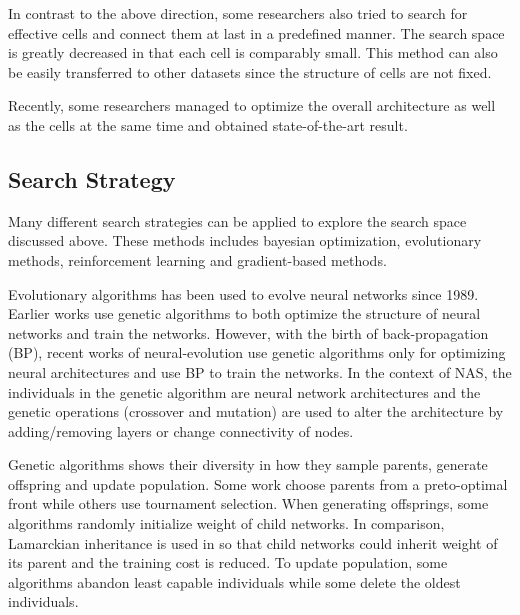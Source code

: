 \documentclass{article}
\begin{document}
\begin{normalsize}
    In contrast to the above direction, some researchers also tried to search for effective cells and connect them at last in a predefined manner\cite{zoph2018learning}\cite{cai2018path}. The search space is greatly decreased in that each cell is comparably small. This method can also be easily transferred to other datasets\cite{zoph2018learning} since the structure of cells are not fixed.

    Recently, some researchers managed to optimize the overall architecture as well as the cells at the same time and obtained state-of-the-art result\cite{liu2019auto}.
    
    \subsection{Search Strategy}
    
    Many different search strategies can be applied to explore the search space discussed above. These methods includes bayesian optimization, evolutionary methods, reinforcement learning and gradient-based methods. 

    Evolutionary algorithms has been used to evolve neural networks since 1989\cite{miller1989designing}. Earlier works use genetic algorithms to both optimize the structure of neural networks and train the networks\cite{stanley2002evolving}. However, with the birth of back-propagation (BP), recent works of neural-evolution use genetic algorithms only for optimizing neural architectures and use BP to train the networks\cite{real2017large}. In the context of NAS, the individuals in the genetic algorithm are neural network architectures and the genetic operations (crossover and mutation) are used to alter the architecture by adding/removing layers or change connectivity of nodes.

    Genetic algorithms shows their diversity in how they sample parents, generate offspring and update population. Some work choose parents from a preto-optimal front\cite{elsken2018efficient} while others use tournament selection\cite{liu2018progressive}\cite{real2018regularized}\cite{real2017large}. When generating offsprings, some algorithms randomly initialize weight of child networks. In comparison, Lamarckian inheritance is used in \cite{elsken2018efficient} so that child networks could inherit weight of its parent and the training cost is reduced. To update population, some algorithms abandon least capable individuals\cite{real2017large} while some delete the oldest individuals\cite{real2018regularized}. 
    

\end{normalsize}
\end{document}
